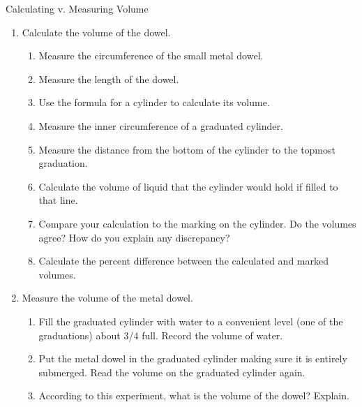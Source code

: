 \begin{act}Calculating v. Measuring Volume\end{act}
\par
\begin{enumerate}
\item Calculate the volume of the dowel.
\begin{enumerate}
\item Measure the circumference of the small metal dowel. 
\item Measure the length of the dowel.
\item Use the formula for a cylinder to calculate its volume. 
\item Measure the inner circumference of a graduated cylinder. 
\item Measure the distance from the bottom of the cylinder to the topmost graduation.
\item Calculate the volume of liquid that the cylinder would hold if filled to that line.
\item Compare your calculation to the marking on the cylinder. Do the volumes agree? How do you explain any discrepancy? 
\item Calculate the percent difference between the calculated and marked volumes.
\end{enumerate}
\item Measure the volume of the metal dowel.
\begin{enumerate}
\item Fill the graduated cylinder with water to a convenient level (one of the graduations) about 3/4 full. Record the volume of water.
\item Put the metal dowel in the graduated cylinder making sure it is entirely submerged. Read the volume on the graduated cylinder again.
\item According to this experiment, what is the volume of the dowel? Explain. 

\end{enumerate}
\end{enumerate}
